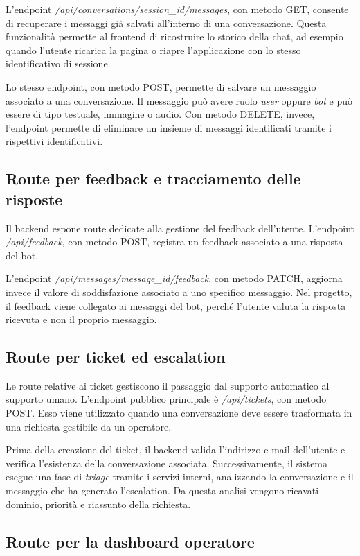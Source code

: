 L’endpoint \textit{/api/conversations/session\_id/messages}, con metodo GET, consente di recuperare i messaggi già salvati all’interno di una conversazione. Questa funzionalità permette al frontend di ricostruire lo storico della chat, ad esempio quando l’utente ricarica la pagina o riapre l’applicazione con lo stesso identificativo di sessione.

Lo stesso endpoint, con metodo POST, permette di salvare un messaggio associato a una conversazione. Il messaggio può avere ruolo \textit{user} oppure \textit{bot} e può essere di tipo testuale, immagine o audio. Con metodo DELETE, invece, l’endpoint permette di eliminare un insieme di messaggi identificati tramite i rispettivi identificativi.

\subsection*{Route per feedback e tracciamento delle risposte}

Il backend espone route dedicate alla gestione del feedback dell’utente. L’endpoint \textit{/api/feedback}, con metodo POST, registra un feedback associato a una risposta del bot.

L’endpoint \textit{/api/messages/message\_id/feedback}, con metodo PATCH, aggiorna invece il valore di soddisfazione associato a uno specifico messaggio. Nel progetto, il feedback viene collegato ai messaggi del bot, perché l’utente valuta la risposta ricevuta e non il proprio messaggio.

\subsection*{Route per ticket ed escalation}

Le route relative ai ticket gestiscono il passaggio dal supporto automatico al supporto umano. L’endpoint pubblico principale è \textit{/api/tickets}, con metodo POST. Esso viene utilizzato quando una conversazione deve essere trasformata in una richiesta gestibile da un operatore.

Prima della creazione del ticket, il backend valida l’indirizzo e-mail dell’utente e verifica l’esistenza della conversazione associata. Successivamente, il sistema esegue una fase di \textit{triage} tramite i servizi interni, analizzando la conversazione e il messaggio che ha generato l’escalation. Da questa analisi vengono ricavati dominio, priorità e riassunto della richiesta.

\subsection*{Route per la dashboard operatore}

